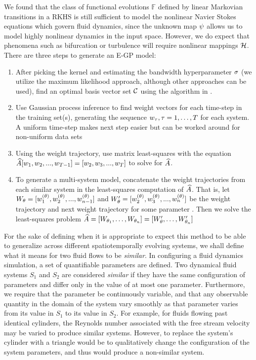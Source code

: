 We found that the class of functional evolutions $\mathbb{F}$ defined by linear Markovian transitions in a RKHS is still sufficient to model the nonlinear Navier Stokes equations which govern fluid dynamics, since the unknown map $\psi$ allows us to model highly nonlinear dynamics in the input space. However, we do expect that phenomena such as bifurcation or turbulence will require nonlinear mappings $\mathcal{H}$. There are three steps to generate an E-GP model:

\begin{enumerate}
	\item After picking the kernel and estimating the bandwidth hyperparameter $\sigma$ (we utilize the maximum likelihood approach, although other approaches can be used), find an optimal basis vector set $\mathcal{C}$ using the algorithm in \cite{csato2002sparse}.
	\item Use Gaussian process inference to find weight vectors for each time-step in the training set(s), generating the sequence $w_\tau, \tau=1,\dots,T$ for each system. A uniform time-step makes next step easier but can be worked around for non-uniform data sets
	\item Using the weight trajectory, use matrix least-squares with the equation $\widehat{A} [w_1,w_2, ...,w_{T-1}] = [w_2,w_3,...,w_T]$ to solve for $\widehat{A}$.
	\item To generate a multi-system model, concatenate the weight trajectories from each similar system in the least-squares computation of $\widehat{A}$. That is, let $W_{\theta} = [w_1^{(\theta)},w_2^{(\theta)}, ...,w_{n-1}^{(\theta)}]$ and $W_{\theta}' = [w_2^{(\theta)},w_3^{(\theta)}, ...,w_n^{(\theta)}]$ be the weight trajectory and next weight trajectory for some parameter . Then we solve the least-squares problem $\widehat{A} = [W_{\theta_1},\dots,W_{\theta_n}] = [W_{\theta}',\dots,W_{\theta_n}']$
\end{enumerate}

For the sake of defining when it is appropriate to expect this method to be able to generalize across different spatiotemporally evolving systems, we shall define what it means for two fluid flows to be \emph{similar}. In configuring a fluid dynamics simulation, a set of quantifiable parameters are defined. Two dynamical fluid systems $S_1$ and $S_2$ are considered \emph{similar} if they have  the same configuration of parameters and differ only in the value of at most one parameter. Furthermore, we require that the parameter be continuously variable, and that any observable quantity in the domain of the system vary smoothly as that parameter varies from its value in $S_1$ to its value in $S_2$. For example, for fluids flowing past identical cylinders, the Reynolds number associated with the free stream velocity may be varied to produce similar systems. However, to replace the system's cylinder with a triangle would be to qualitatively change the configuration of the system parameters, and thus would produce a non-similar system.

